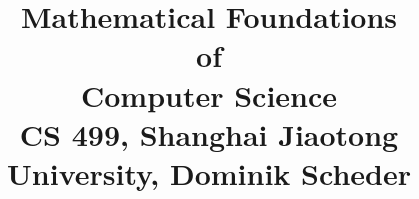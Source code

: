 

\date{}

\title{
  Mathematical Foundations \\of \\Computer Science\\
  \vspace{3mm}
{\normalsize CS 499,	Shanghai Jiaotong University,  Dominik Scheder}
}



\maketitle

%
%
